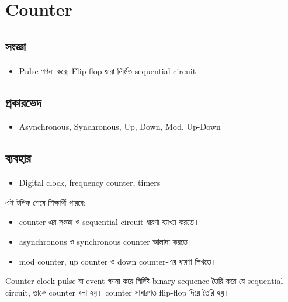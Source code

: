 \section{Counter}

\subsection{সংজ্ঞা}
\begin{itemize}
\item Pulse গণনা করে; Flip-flop দ্বারা নির্মিত sequential circuit
\end{itemize}

\subsection{প্রকারভেদ}
\begin{itemize}
\item Asynchronous, Synchronous, Up, Down, Mod, Up-Down
\end{itemize}

\subsection{ব্যবহার}
\begin{itemize}
\item Digital clock, frequency counter, timers
\end{itemize}

\begin{learningbox}
এই টপিক শেষে শিক্ষার্থী পারবে:
\begin{itemize}
\item counter-এর সংজ্ঞা ও sequential circuit ধারণা ব্যাখ্যা করতে।
\item asynchronous ও synchronous counter আলাদা করতে।
\item mod counter, up counter ও down counter-এর ধারণা লিখতে।
\end{itemize}
\end{learningbox}

\begin{definitionbox}{Counter}
clock pulse বা event গণনা করে নির্দিষ্ট binary sequence তৈরি করে যে sequential circuit, তাকে counter বলা হয়। counter সাধারণত flip-flop দিয়ে তৈরি হয়।
\end{definitionbox}


